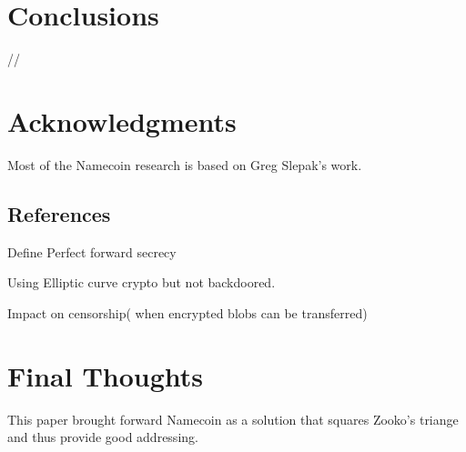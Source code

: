 \documentclass{vldb}
\begin{document}
\section{Conclusions}
//\balance

\section{Acknowledgments}
Most of the Namecoin research is based on Greg Slepak's work.


\subsection{References}

\begin{appendix}
Define Perfect forward secrecy

Using Elliptic curve crypto but not backdoored.

Impact on censorship( when encrypted blobs can be transferred)
\section{Final Thoughts}
This paper brought forward Namecoin as a solution that squares Zooko's triange and thus provide good addressing.
\end{appendix}
\end{document}
